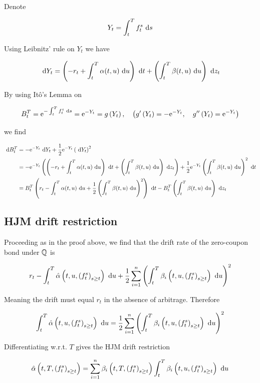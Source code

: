 Denote

$$
Y_{t}=\int_{t}^{T} f_{t}^{s} \text{ d}  s
$$

Using Leibnitz' rule on $Y_{t}$ we have

$$
\text{ d}  Y_{t}=\left(-r_{t}+\int_{t}^{T} \alpha(t, u) \text{ d}  u\right) \text{ d}  t+\left(\int_{t}^{T} \beta(t, u) \text{ d}  u\right) \text{ d}  z_{t}
$$

By using Itô's Lemma on

$$
B_{t}^{T}=\mathrm{e}^{-\int_{t}^{T} f_{t}^{s} \text{ d}  s}=\mathrm{e}^{-Y_{t}}=g\left(Y_{t}\right), \quad\left(g^{\prime}\left(Y_{t}\right)=-\mathrm{e}^{-Y_{t}}, \quad g^{\prime \prime}\left(Y_{t}\right)=\mathrm{e}^{-Y_{t}}\right)
$$

we find

$$
\begin{aligned}
\text{ d}  B_{t}^{T} & =-\mathrm{e}^{-Y_{t}} \text{ d}  Y_{t}+\frac{1}{2} \mathrm{e}^{-Y_{t}}\left(\text{ d}  Y_{t}\right)^{2} \\
& =-\mathrm{e}^{-Y_{t}}\left(\left(-r_{t}+\int_{t}^{T} \alpha(t, u) \text{ d}  u\right) \text{ d}  t+\left(\int_{t}^{T} \beta(t, u) \text{ d}  u\right) \text{ d}  z_{t}\right)+\frac{1}{2} \mathrm{e}^{-Y_{t}}\left(\int_{t}^{T} \beta(t, u) \text{ d}  u\right)^{2} \text{ d}  t \\
& =B_{t}^{T}\left(r_{t}-\int_{t}^{T} \alpha(t, u) \text{ d}  u+\frac{1}{2}\left(\int_{t}^{T} \beta(t, u) \text{ d}  u\right)^{2}\right) \text{ d}  t-B_{t}^{T}\left(\int_{t}^{T} \beta(t, u) \text{ d}  u\right) \text{ d}  z_{t}
\end{aligned}
$$

\subsection{HJM drift restriction}
Proceeding as in the proof above, we find that the drift rate of the zero-coupon bond under $\mathbb{Q}$ is

$$
r_{t}-\int_{t}^{T} \hat{\alpha}\left(t, u,\left(f_{t}^{s}\right)_{s \geq t}\right) \text{ d}  u+\frac{1}{2} \sum_{i=1}^{n}\left(\int_{t}^{T} \beta_{i}\left(t, u,\left(f_{t}^{s}\right)_{s \geq t}\right) \text{ d}  u\right)^{2}
$$

Meaning the drift must equal $r_{t}$ in the absence of arbitrage. Therefore

$$
\int_{t}^{T} \hat{\alpha}\left(t, u,\left(f_{t}^{s}\right)_{s \geq t}\right) \text{ d}  u=\frac{1}{2} \sum_{i=1}^{n}\left(\int_{t}^{T} \beta_{i}\left(t, u,\left(f_{t}^{s}\right)_{s \geq t}\right) \text{ d}  u\right)^{2}
$$

Differentiating w.r.t. $T$ gives the HJM drift restriction

$$
\hat{\alpha}\left(t, T,\left(f_{t}^{s}\right)_{s \geq t}\right)=\sum_{i=1}^{n} \beta_{i}\left(t, T,\left(f_{t}^{s}\right)_{s \geq t}\right) \int_{t}^{T} \beta_{i}\left(t, u,\left(f_{t}^{s}\right)_{s \geq t}\right) \text{ d}  u
$$

